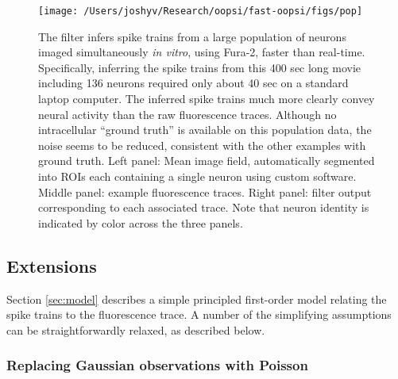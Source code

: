 \begin{figure}[h!]
\begin{centering} 
\texttt{[image: /Users/joshyv/Research/oopsi/fast-oopsi/figs/pop]}
\end{centering}
\caption[\foopsi filter is robust and works online for populations of neurons]{The \foopsi filter infers spike trains from a large population of neurons imaged simultaneously \emph{in vitro}, using Fura-2, faster than real-time.  Specifically, inferring the spike trains from this 400 sec long movie including 136 neurons required only about 40 sec on a standard laptop computer. The inferred spike trains much more clearly convey neural activity than the raw fluorescence traces.  Although no intracellular ``ground truth'' is available on this population data, the noise seems to be reduced, consistent with the other examples with ground truth.  Left panel: Mean image field, automatically segmented into ROIs each containing a single neuron using custom software.  Middle panel: example fluorescence traces.  Right panel: \foopsi filter output corresponding to each associated trace. Note that neuron identity is indicated by color across the three panels.} \label{fig:pop}
\end{figure}


\subsection{Extensions}

Section \ref{sec:model} describes a simple principled first-order model relating the spike trains to the fluorescence trace. A number of the simplifying assumptions can be straightforwardly relaxed, as described below.


\subsubsection{Replacing Gaussian observations with Poisson}

